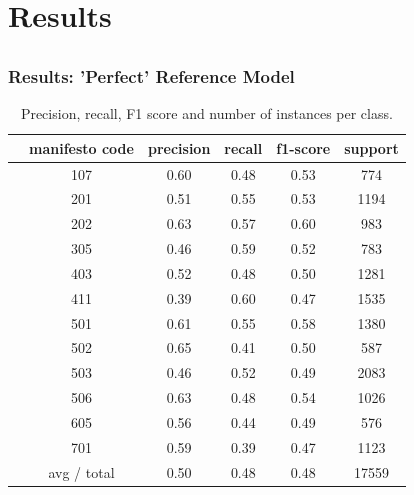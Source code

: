 \documentclass[]{beamer}
\begin{document}
\section{Results}
\subsection{}


\begin{frame}\frametitle{Results: 'Perfect' Reference Model}
\footnotesize
\begin{table}
\centering
\begin{tabular}{cccccc}
\toprule
&  manifesto code & precision  &  recall&  f1-score &  support\\
\midrule
&   107&  0.60& 0.48& 0.53&  774\\
&   201&  0.51& 0.55& 0.53& 1194\\
&   202&  0.63& 0.57& 0.60&  983\\
&   305&  0.46& 0.59& 0.52&  783\\
&   403&  0.52& 0.48& 0.50& 1281\\
&   411&  0.39& 0.60& 0.47& 1535\\
&   501&  0.61& 0.55& 0.58& 1380\\
&   502&  0.65& 0.41& 0.50&  587\\
&   503&  0.46& 0.52& 0.49& 2083\\
&   506&  0.63& 0.48& 0.54& 1026\\
&   605&  0.56& 0.44& 0.49&  576\\
&   701&  0.59& 0.39& 0.47& 1123\\
\bottomrule
& avg / total&  0.50& 0.48& 0.48&17559\\
\end{tabular}
\caption{Precision, recall, F1 score and number of instances per class. }
\label{tab:baseline_model_report} 
\end{table}

\end{frame}
\end{document}
